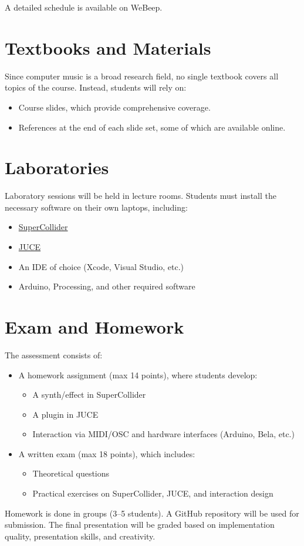 A detailed schedule is available on WeBeep.

\section{Textbooks and Materials}

Since computer music is a broad research field, no single textbook covers all topics of the course. Instead, students will rely on:

\begin{itemize}
    \item Course slides, which provide comprehensive coverage.
    \item References at the end of each slide set, some of which are available online.
\end{itemize}

\section{Laboratories}

Laboratory sessions will be held in lecture rooms. Students must install the necessary software on their own laptops, including:

\begin{itemize}
    \item \href{http://supercollider.github.io/download}{SuperCollider}
    \item \href{https://juce.com}{JUCE}
    \item An IDE of choice (Xcode, Visual Studio, etc.)
    \item Arduino, Processing, and other required software
\end{itemize}

\section{Exam and Homework}

The assessment consists of:

\begin{itemize}
    \item A homework assignment (max 14 points), where students develop:
    \begin{itemize}
        \item A synth/effect in SuperCollider
        \item A plugin in JUCE
        \item Interaction via MIDI/OSC and hardware interfaces (Arduino, Bela, etc.)
    \end{itemize}
    \item A written exam (max 18 points), which includes:
    \begin{itemize}
        \item Theoretical questions
        \item Practical exercises on SuperCollider, JUCE, and interaction design
    \end{itemize}
\end{itemize}

Homework is done in groups (3–5 students). A GitHub repository will be used for submission. The final presentation will be graded based on implementation quality, presentation skills, and creativity.